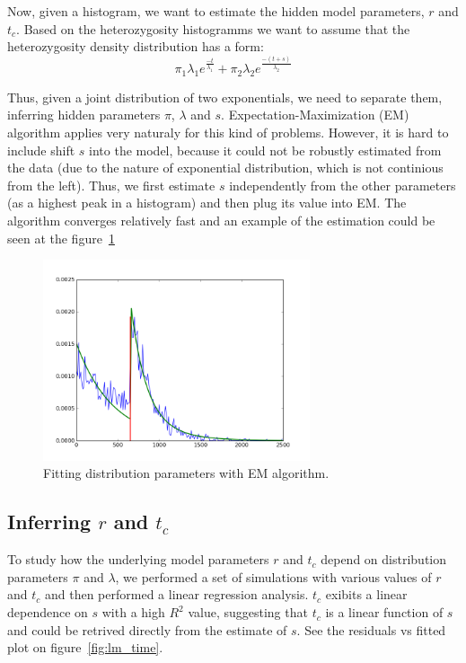 \documentclass[a4paper]{article}
\begin{document}
Now, given a histogram, we want to estimate the hidden model parameters, $r$
and $t_c$. Based on the heterozygosity histogramms 
we want to assume that the heterozygosity density distribution has a form: 
\begin{equation}
\pi_1 \lambda_1 e ^ {\frac{-t}{\lambda_1} } + \pi_2 \lambda_2 e ^ {\frac{-(t + s)}{\lambda_2} }
\end{equation}

Thus, given a joint distribution of two exponentials, we need to separate them, inferring
hidden parameters $\pi$, $\lambda$ and $s$. Expectation-Maximization (EM) algorithm applies
very naturaly for this kind of problems. However, it is hard to include shift $s$ into the
model, because it could not be robustly estimated from the data (due to the nature of
exponential distribution, which is not continious from the left). Thus, we first estimate $s$
independently from the other parameters (as a highest peak in a histogram) and then
plug its value into EM. The algorithm converges relatively fast and an example of 
the estimation could be seen at the figure~\ref{fig:em}

\begin{figure} [h]
\centering
\includegraphics[width=0.7\textwidth]{figure_em.png}
\caption{Fitting distribution parameters with EM algorithm.}
\label{fig:em}
\end{figure}

\subsection{Inferring $r$ and $t_c$}

To study how the underlying model parameters $r$ and $t_c$ depend on distribution
parameters $\pi$ and $\lambda$, we performed a set of simulations with various
values of $r$ and $t_c$ and then performed a linear regression analysis. $t_c$
exibits a linear dependence on $s$ with a high $R^2$ value, suggesting that
$t_c$ is a linear function of $s$ and could be retrived directly from the estimate
of $s$. See the residuals vs fitted plot on figure~\ref{fig:lm_time}.
\end{document}
